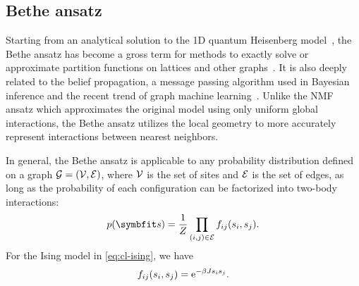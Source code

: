 \subsection{Bethe ansatz}
\label{sec:bethe}

Starting from an analytical solution to the 1D quantum Heisenberg model~\cite{bethe1931theorie}, the Bethe ansatz has become a gross term for methods to exactly solve or approximate partition functions on lattices and other graphs~\cite{baxter1995solvable, caravelli2022some, gujrati1995bethe, mezard2001bethe}. It is also deeply related to the belief propagation, a message passing algorithm used in Bayesian inference and the recent trend of graph machine learning~\cite{yedidia2003understanding, ikeda2004stochastic}. Unlike the NMF ansatz which approximates the original model using only uniform global interactions, the Bethe ansatz utilizes the local geometry to more accurately represent interactions between nearest neighbors.

In general, the Bethe ansatz is applicable to any probability distribution defined on a graph $\mathcal{G} = (\mathcal{V}, \mathcal{E})$, where $\mathcal{V}$ is the set of sites and $\mathcal{E}$ is the set of edges, as long as the probability of each configuration can be factorized into two-body interactions:
\begin{equation}
p(\vs) = \frac{1}{Z} \prod_{(i, j) \in \calE} f_{i j}(s_i, s_j).
\end{equation}
For the Ising model in \cref{eq:cl-ising}, we have
\begin{equation}
f_{i j}(s_i, s_j) = \mathrm{e}^{-\beta J s_i s_j}.
\end{equation}

